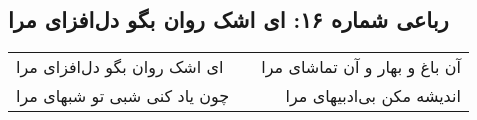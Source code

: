 \begin{center}
\section*{رباعی شماره ۱۶: ای اشک روان بگو دل‌افزای مرا}
\label{sec:0016}
\begin{longtable}{l p{0.5cm} r}
ای اشک روان بگو دل‌افزای مرا
&&
آن باغ و بهار و آن تماشای مرا
\\
چون یاد کنی شبی تو شبهای مرا
&&
اندیشه مکن بی‌ادبیهای مرا
\\
\end{longtable}
\end{center}

